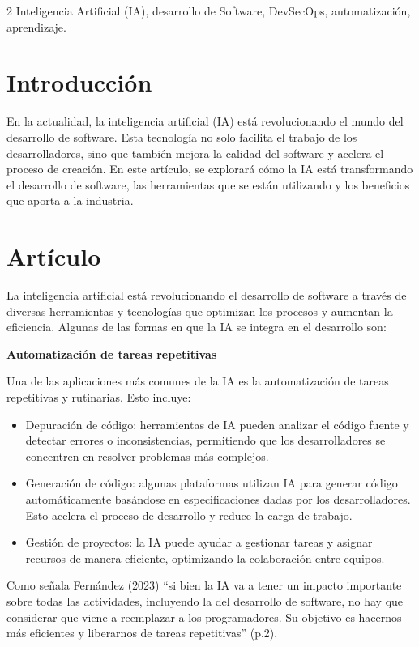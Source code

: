 \documentclass[12pt,spanish,Letterpaper,openany]{book}
\begin{document}
\begin {multicols}{2}
Inteligencia Artificial (IA), desarrollo de Software, DevSecOps, automatización, aprendizaje.

\hypertarget{introducciuxf3n-6}{%
\section{Introducción}\label{introducciuxf3n-6}}

En la actualidad, la inteligencia artificial (IA) está revolucionando el mundo del desarrollo de software. Esta tecnología no solo facilita el trabajo de los desarrolladores, sino que también mejora la calidad del software y acelera el proceso de creación. En este artículo, se explorará cómo la IA está transformando el desarrollo de software, las herramientas que se están utilizando y los beneficios que aporta a la industria.

\hypertarget{artuxedculo-5}{%
\section{Artículo}\label{artuxedculo-5}}

La inteligencia artificial está revolucionando el desarrollo de software a través de diversas herramientas y tecnologías que optimizan los procesos y aumentan la eficiencia. Algunas de las formas en que la IA se integra en el desarrollo son:

\textbf{Automatización de tareas repetitivas}

Una de las aplicaciones más comunes de la IA es la automatización de tareas repetitivas y rutinarias. Esto incluye:

\begin{itemize}
\item
  Depuración de código: herramientas de IA pueden analizar el código fuente y detectar errores o inconsistencias, permitiendo que los desarrolladores se concentren en resolver problemas más complejos.
\item
  Generación de código: algunas plataformas utilizan IA para generar código automáticamente basándose en especificaciones dadas por los desarrolladores. Esto acelera el proceso de desarrollo y reduce la carga de trabajo.
\item
  Gestión de proyectos: la IA puede ayudar a gestionar tareas y asignar recursos de manera eficiente, optimizando la colaboración entre equipos.
\end{itemize}

Como señala Fernández (2023) ``si bien la IA va a tener un impacto importante sobre todas las actividades, incluyendo la del desarrollo de software, no hay que considerar que viene a reemplazar a los programadores. Su objetivo es hacernos más eficientes y liberarnos de tareas repetitivas'' (p.2).


\end{multicols}
\end{document}
